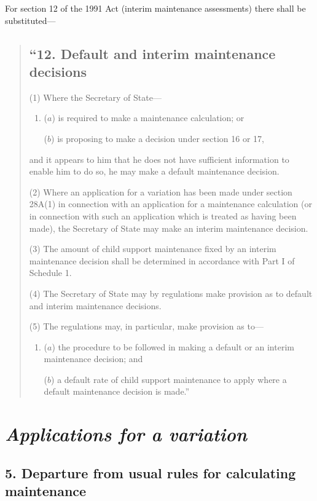 \documentclass[12pt,a4paper]{article}
\begin{document}
For section 12 of the 1991 Act (interim maintenance assessments) there shall be substituted—
\begin{quotation}
\subsection*{“12. Default and interim maintenance decisions}

(1) Where the Secretary of State—
\begin{enumerate}\item[]
($a$) is required to make a maintenance calculation; or

($b$) is proposing to make a decision under section 16 or 17,
\end{enumerate}
and it appears to him that he does not have sufficient information to enable him to do so, he may make a default maintenance decision.

(2) Where an application for a variation has been made under section 28A(1)  in connection with an application for a maintenance calculation (or in connection with such an application which is treated as having been made), the Secretary of State may make an interim maintenance decision.

(3) The amount of child support maintenance fixed by an interim maintenance decision shall be determined in accordance with Part I of Schedule 1. 

(4) The Secretary of State may by regulations make provision as to default and interim maintenance decisions.

(5) The regulations may, in particular, make provision as to—
\begin{enumerate}\item[]
($a$) the procedure to be followed in making a default or an interim maintenance decision; and

($b$) a default rate of child support maintenance to apply where a default maintenance decision is made.”
\end{enumerate}
\end{quotation}


\section{\itshape Applications for a variation}

\subsection{5. Departure from usual rules for calculating maintenance}
\end{document}
